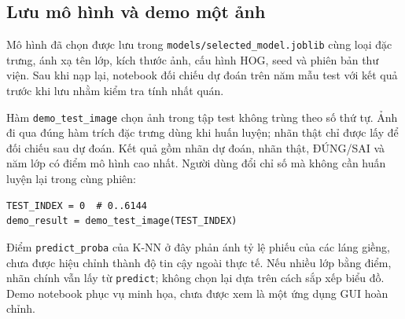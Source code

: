 \subsection{Lưu mô hình và demo một ảnh}
Mô hình đã chọn được lưu trong \texttt{models/selected\_model.joblib} cùng loại đặc trưng, ánh xạ tên lớp, kích thước ảnh, cấu hình HOG, seed và phiên bản thư viện. Sau khi nạp lại, notebook đối chiếu dự đoán trên năm mẫu test với kết quả trước khi lưu nhằm kiểm tra tính nhất quán.

Hàm \texttt{demo\_test\_image} chọn ảnh trong tập test không trùng theo số thứ tự. Ảnh đi qua đúng hàm trích đặc trưng dùng khi huấn luyện; nhãn thật chỉ được lấy để đối chiếu sau dự đoán. Kết quả gồm nhãn dự đoán, nhãn thật, ĐÚNG/SAI và năm lớp có điểm mô hình cao nhất. Người dùng đổi chỉ số mà không cần huấn luyện lại trong cùng phiên:
\par\noindent\begin{minipage}{\linewidth}
\begin{lstlisting}
TEST_INDEX = 0  # 0..6144
demo_result = demo_test_image(TEST_INDEX)
\end{lstlisting}
\end{minipage}\par
Điểm \texttt{predict\_proba} của K-NN ở đây phản ánh tỷ lệ phiếu của các láng giềng, chưa được hiệu chỉnh thành độ tin cậy ngoài thực tế. Nếu nhiều lớp bằng điểm, nhãn chính vẫn lấy từ \texttt{predict}; không chọn lại dựa trên cách sắp xếp biểu đồ. Demo notebook phục vụ minh họa, chưa được xem là một ứng dụng GUI hoàn chỉnh.
